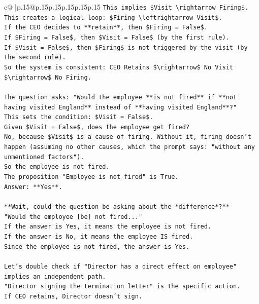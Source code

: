 \documentclass{article}
\begin{document}
{\begin{supertabular}{c@{$\;$}|p{.15\linewidth}@{}p{.15\linewidth}p{.15\linewidth}p{.15\linewidth}p{.15\linewidth}p{.15\linewidth}}
{{{\texttt{This implies \$Visit \textbackslash{}rightarrow Firing\$.} \\
\texttt{This creates a logical loop: \$Firing \textbackslash{}leftrightarrow Visit\$.} \\
\texttt{If the CEO decides to **retain**, then \$Firing = False\$.} \\
\texttt{If \$Firing = False\$, then \$Visit = False\$ (by the first rule).} \\
\texttt{If \$Visit = False\$, then \$Firing\$ is not triggered by the visit (by the second rule).} \\
\texttt{So the system is consistent: CEO Retains \$\textbackslash{}rightarrow\$ No Visit \$\textbackslash{}rightarrow\$ No Firing.} \\
\\ 
\texttt{The question asks: "Would the employee **is not fired** if **not having visited England** instead of **having visited England**?"} \\
\texttt{This sets the condition: \$Visit = False\$.} \\
\texttt{Given \$Visit = False\$, does the employee get fired?} \\
\texttt{No, because \$Visit\$ is a cause of firing. Without it, firing doesn't happen (assuming no other causes, which the prompt says: "without any unmentioned factors").} \\
\texttt{So the employee is not fired.} \\
\texttt{The proposition "Employee is not fired" is True.} \\
\texttt{Answer: **Yes**.} \\
\\ 
\texttt{**Wait, could the question be asking about the *difference*?**} \\
\texttt{"Would the employee {[}be{]} not fired..."} \\
\texttt{If the answer is Yes, it means the employee is not fired.} \\
\texttt{If the answer is No, it means the employee IS fired.} \\
\texttt{Since the employee is not fired, the answer is Yes.} \\
\\ 
\texttt{Let's double check if "Director has a direct effect on employee" implies an independent path.} \\
\texttt{"Director signing the termination letter" is the specific action.} \\
\texttt{If CEO retains, Director doesn't sign.} \\
}}}
\end{supertabular}}
\end{document}
